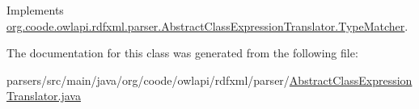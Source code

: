 Implements \hyperlink{interfaceorg_1_1coode_1_1owlapi_1_1rdfxml_1_1parser_1_1_abstract_class_expression_translator_1_1_type_matcher_a8681a2ec4ff12fd0fd9fca6183f88f9b}{org.\-coode.\-owlapi.\-rdfxml.\-parser.\-Abstract\-Class\-Expression\-Translator.\-Type\-Matcher}.



The documentation for this class was generated from the following file\-:\begin{DoxyCompactItemize}
\item 
parsers/src/main/java/org/coode/owlapi/rdfxml/parser/\hyperlink{_abstract_class_expression_translator_8java}{Abstract\-Class\-Expression\-Translator.\-java}\end{DoxyCompactItemize}
